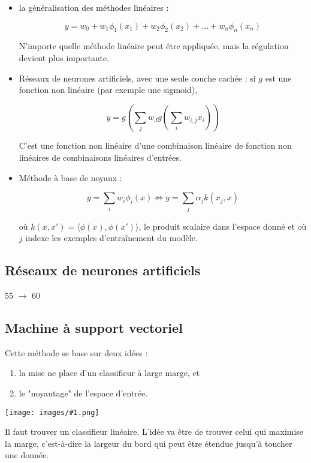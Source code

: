 \documentclass[10pt,a4paper]{report}
\newcommand{\dessin}[1]{\begin{center}\texttt{[image: images/\#1.png]}\end{center}}
\begin{document}
			\begin{itemize}
				\item la généralisation des méthodes linéaires :
				
				$$y = w_0 + w_1 \phi_1(x_1) + w_2 \phi_2(x_2) + \dots + w_n \phi_n(x_n)$$
				
				N'importe quelle méthode linéaire peut être appliquée, mais la régulation devient plus importante.
				
				\item Réseaux de neurones artificiels, avec une seule couche cachée : si $g$ est une fonction non linéaire (par exemple une sigmoid),
				
				$$y = g(\sum_j w_J g(\sum_i w_{i, j} x_i))$$
				
				C'est une fonction non linéaire d'une combinaison linéaire de fonction non linéaires de combinaisons linéaires d'entrées.
				
				\item Méthode à base de noyaux :
				
				$$y = \sum_i w_i \phi_i(x) \Leftrightarrow y = \sum_j \alpha_j k(x_j, x)$$
				
				où $k(x, x') = \langle \phi(x), \phi(x') \rangle$, le produit scalaire dans l'espace donné et où $j$ indexe les exemples d'entraînement du modèle.
			\end{itemize}
	
		\subsection{Réseaux de neurones artificiels}
		
		55 $\rightarrow$ 60
		
		\subsection{Machine à support vectoriel}
		
		Cette méthode se base sur deux idées :
		
		\begin{enumerate}
			\item la mise ne place d'un classifieur à large marge, et
			\item le "noyautage" de l'espace d'entrée.
		\end{enumerate}
		
		\dessin{14}
		Il faut trouver un classifieur linéaire. L'idée va être de trouver celui qui maximise la marge, c'est-à-dire la largeur du bord qui peut être étendue jusqu'à toucher une donnée.
		
\end{document}
